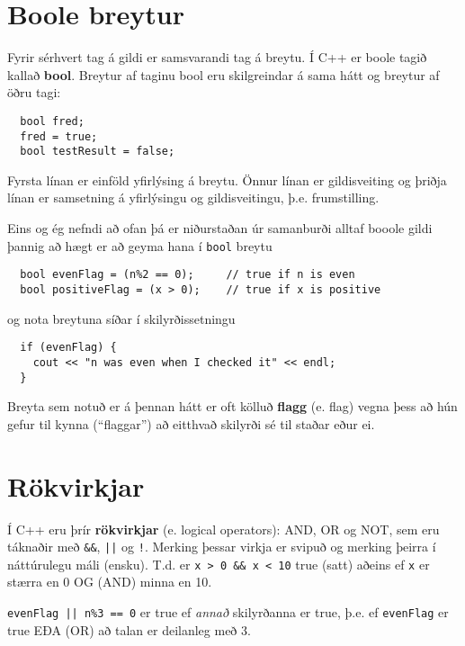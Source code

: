 \section{Boole breytur}

Fyrir sérhvert tag á gildi er samsvarandi tag á breytu.
Í C++ er boole tagið kallað {\bf bool}.
Breytur af taginu bool eru skilgreindar á sama hátt og breytur af öðru tagi:

\begin{verbatim}
  bool fred;
  fred = true;
  bool testResult = false;
\end{verbatim}
%
Fyrsta línan er einföld yfirlýsing á breytu.
Önnur línan er gildisveiting og þriðja línan er samsetning á yfirlýsingu og gildisveitingu, þ.e. frumstilling.


Eins og ég nefndi að ofan þá er niðurstaðan úr samanburði alltaf booole gildi þannig að hægt er að geyma hana í {\tt bool} breytu

\begin{verbatim}
  bool evenFlag = (n%2 == 0);     // true if n is even
  bool positiveFlag = (x > 0);    // true if x is positive
\end{verbatim}
%
og nota breytuna síðar í skilyrðissetningu 

\begin{verbatim}
  if (evenFlag) {
    cout << "n was even when I checked it" << endl;
  }
\end{verbatim}
%
Breyta sem notuð er á þennan hátt er oft kölluð {\bf flagg} (e. flag)
vegna þess að hún gefur til kynna (``flaggar'') að eitthvað skilyrði sé til staðar eður ei.


\section{Rökvirkjar}

Í C++ eru þrír {\bf rökvirkjar} (e. logical operators): AND, OR og NOT,
sem eru táknaðir með {\tt \&\&}, {\tt ||} og {\tt !}.
Merking þessar virkja er svipuð og merking þeirra í náttúrulegu máli (ensku).
T.d. er {\tt x > 0 \&\& x < 10} true (satt) aðeins ef {\tt x} er stærra en 0 OG (AND) minna en 10.


{\tt evenFlag || n\%3 == 0} er true ef {\em annað} skilyrðanna er true, þ.e. ef {\tt evenFlag} er true EÐA (OR) að talan er deilanleg með 3.


